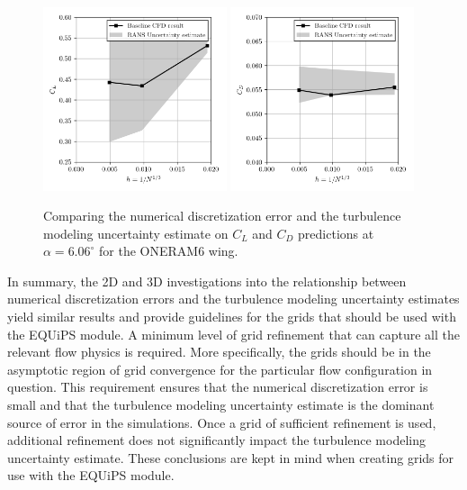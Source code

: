 \begin{figure}
\center
\subfigure%
  {\includegraphics[width=0.48\textwidth]{code/image_gen/oneram6/images/CL_06aoa.png}}
\subfigure%
  {\includegraphics[width=0.48\textwidth]{code/image_gen/oneram6/images/CD_06aoa.png}}
\caption{Comparing the numerical discretization error and the turbulence modeling uncertainty estimate on $C_L$ and $C_D$ predictions at $\alpha = 6.06^\circ$ for the ONERAM6 wing.}\label{fig:oneram6_6aoa}
\end{figure}

In summary, the 2D and 3D investigations into the relationship between numerical discretization errors and the turbulence modeling uncertainty estimates yield similar results and provide guidelines for the grids that should be used with the EQUiPS module.
A minimum level of grid refinement that can capture all the relevant flow physics is required.
More specifically, the grids should be in the asymptotic region of grid convergence for the particular flow configuration in question.
This requirement ensures that the numerical discretization error is small and that the turbulence modeling uncertainty estimate is the dominant source of error in the simulations. 
Once a grid of sufficient refinement is used, additional refinement does not significantly impact the turbulence modeling uncertainty estimate.
These conclusions are kept in mind when creating grids for use with the EQUiPS module. 